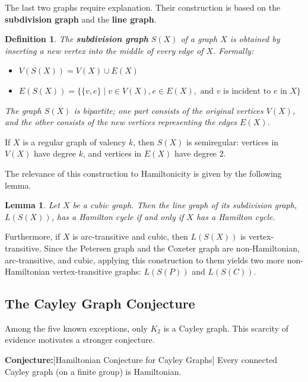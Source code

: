 \documentclass[12pt,a4paper,openany]{book}
\newtheorem{definition}{Definition}[section]
\newtheorem{lemma}{Lemma}[section]
\begin{document}
The last two graphs require explanation. Their construction is based on the \textbf{subdivision graph} and the \textbf{line graph}.

\begin{definition}
The \textbf{subdivision graph} $S(X)$ of a graph $X$ is obtained by inserting a new vertex into the middle of every edge of $X$. Formally:
\begin{itemize}
    \item $V(S(X)) = V(X) \cup E(X)$
    \item $E(S(X)) = \{ \{v, e\} \mid v \in V(X), e \in E(X), \text{ and } v \text{ is incident to } e \text{ in } X \}$
\end{itemize}
The graph $S(X)$ is bipartite; one part consists of the original vertices $V(X)$, and the other consists of the new vertices representing the edges $E(X)$.
\end{definition}

If $X$ is a regular graph of valency $k$, then $S(X)$ is semiregular: vertices in $V(X)$ have degree $k$, and vertices in $E(X)$ have degree $2$.



The relevance of this construction to Hamiltonicity is given by the following lemma.

\begin{lemma}\label{lem:hamilton-construction}
Let $X$ be a cubic graph. Then the line graph of its subdivision graph, $L(S(X))$, has a Hamilton cycle if and only if $X$ has a Hamilton cycle.
\end{lemma}

Furthermore, if $X$ is arc-transitive and cubic, then $L(S(X))$ is vertex-transitive. Since the Petersen graph and the Coxeter graph are non-Hamiltonian, arc-transitive, and cubic, applying this construction to them yields two more non-Hamiltonian vertex-transitive graphs: $L(S(P))$ and $L(S(C))$.

\subsection{The Cayley Graph Conjecture}

Among the five known exceptions, only $K_2$ is a Cayley graph. This scarcity of evidence motivates a stronger conjecture.
\bigskip

\noindent\textbf{Conjecture:}[Hamiltonian Conjecture for Cayley Graphs]
Every connected Cayley graph (on a finite group) is Hamiltonian.

\bigskip
\end{document}
